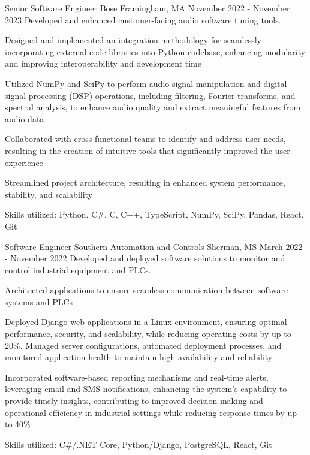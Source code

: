\begin{cventries}
  \cventry
    {Senior Software Engineer} %
    {Bose} %
    {Framingham, MA} %
    {November 2022 - November 2023} %
    {Developed and enhanced customer-facing audio software tuning tools.}
    {
      \begin{cvitems}
        \item {Designed and implemented an integration methodology for seamlessly incorporating external code libraries into Python codebase, enhancing modularity and improving interoperability and development time}
        \item {Utilized NumPy and SciPy to perform audio signal manipulation and digital signal processing (DSP) operations, including filtering, Fourier transforms, and spectral analysis, to enhance audio quality and extract meaningful features from audio data}
        \item {Collaborated with cross-functional teams to identify and address user needs, resulting in the creation of intuitive tools that significantly improved the user experience} 
        \item {Streamlined project architecture, resulting in enhanced system performance, stability, and scalability}
        \item {Skills utilized: Python, C\#, C, C++, TypeScript, NumPy, SciPy, Pandas, React, Git} 
      \end{cvitems}
    }

  \cventry
    {Software Engineer} %
    {Southern Automation and Controls} %
    {Sherman, MS} %
    {March 2022 - November 2022} %
    {Developed and deployed software solutions to monitor and control industrial equipment and PLCs.}
    {
      \begin{cvitems}
        \item {Architected applications to ensure seamless communication between software systems and PLCs}
        \item {Deployed Django web applications in a Linux environment, ensuring optimal performance, security, and scalability, while reducing operating costs by up to 20\%. Managed server configurations, automated deployment processes, and monitored application health to maintain high availability and reliability}
        \item {Incorporated software-based reporting mechanisms and real-time alerts, leveraging email and SMS notifications, enhancing the system's capability to provide timely insights, contributing to improved decision-making and operational efficiency in industrial settings while reducing response times by up to 40\%} 
        \item {Skills utilized: C\#/.NET Core, Python/Django, PostgreSQL, React, Git} 
      \end{cvitems}
    }


\end{cventries}
